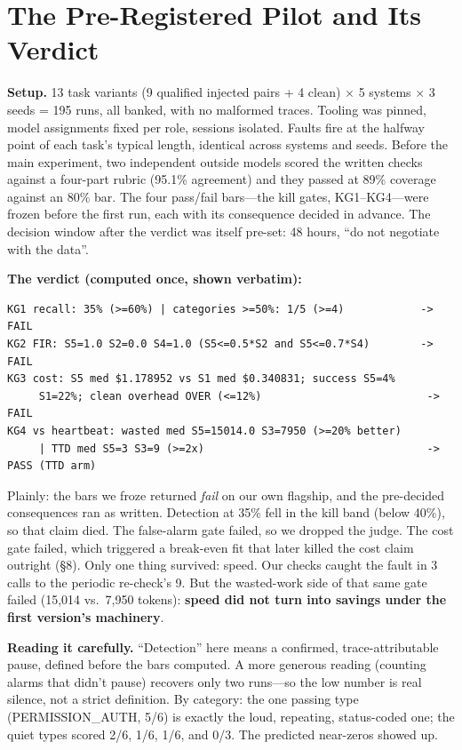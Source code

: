 \documentclass[acmsmall,screen]{acmart}
\begin{document}
\section{The Pre-Registered Pilot and Its Verdict}
\textbf{Setup.} 13 task variants (9 qualified injected pairs + 4 clean) $\times$
5 systems $\times$ 3 seeds = 195 runs, all banked, with no malformed traces.
Tooling was pinned, model assignments fixed per role, sessions isolated. Faults
fire at the halfway point of each task's typical length, identical across
systems and seeds. Before the main experiment, two independent outside models
scored the written checks against a four-part rubric (95.1\% agreement) and they
passed at 89\% coverage against an 80\% bar. The four pass/fail bars---the kill gates, KG1--KG4---were frozen
before the first run, each with its consequence decided in advance. The decision
window after the verdict was itself pre-set: 48 hours, ``do not negotiate with
the data''.

\textbf{The verdict (computed once, shown verbatim):}

\begin{lstlisting}
KG1 recall: 35% (>=60%) | categories >=50%: 1/5 (>=4)            -> FAIL
KG2 FIR: S5=1.0 S2=0.0 S4=1.0 (S5<=0.5*S2 and S5<=0.7*S4)        -> FAIL
KG3 cost: S5 med $1.178952 vs S1 med $0.340831; success S5=4%
     S1=22%; clean overhead OVER (<=12%)                          -> FAIL
KG4 vs heartbeat: wasted med S5=15014.0 S3=7950 (>=20% better)
     | TTD med S5=3 S3=9 (>=2x)                                   -> PASS (TTD arm)
\end{lstlisting}

Plainly: the bars we froze returned \emph{fail} on our own flagship, and the
pre-decided consequences ran as written. Detection at 35\% fell in the kill
band (below 40\%), so that claim died. The false-alarm gate failed, so we
dropped the judge. The cost gate failed, which triggered a break-even fit that
later killed the cost claim outright (\S8). Only one thing survived: speed. Our
checks caught the fault in 3 calls to the periodic re-check's 9. But the
wasted-work side of that same gate failed (15,014 vs.\ 7,950 tokens):
\textbf{speed did not turn into savings under the first version's machinery}.

\textbf{Reading it carefully.} ``Detection'' here means a confirmed,
trace-attributable pause, defined before the bars computed. A more generous
reading (counting alarms that didn't pause) recovers only two runs---so the low
number is real silence, not a strict definition. By category: the one passing
type (PERMISSION\_AUTH, 5/6) is exactly the loud, repeating, status-coded one;
the quiet types scored 2/6, 1/6, 1/6, and 0/3. The predicted near-zeros showed
up.
\end{document}
